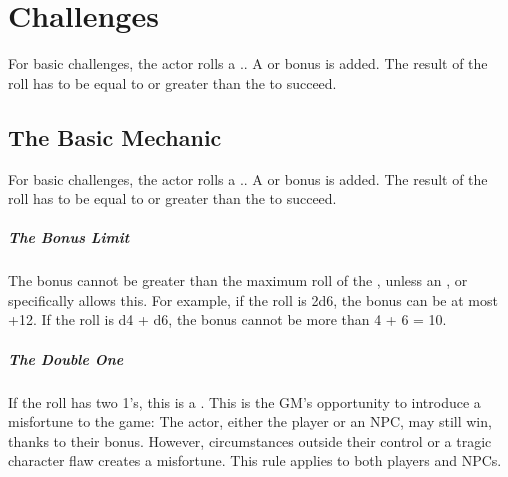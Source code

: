 \documentclass{LegrandOrangeTufteBook}
\begin{document}
\chapterspaceabove{6.75cm}
\chapterspacebelow{11.25cm}


\chapter*{Challenges}

\begin{emphasisParagraph}
	For basic challenges, the actor rolls a ..
	A  or  bonus is added.
	The result of the roll has to be equal to or greater than the  to succeed.
\end{emphasisParagraph}

\section*{The Basic Mechanic}
For basic challenges, the actor rolls a ..
A  or  bonus is added.
The result of the roll has to be equal to
or greater than the  to succeed.\\

\paragraph*{The Bonus Limit}
The bonus cannot be greater than the maximum roll of the ,
unless an ,  or  specifically allows this.
For example, if the roll is 2d6, the bonus can be at most +12. If the roll is d4 + d6,
the bonus cannot be more than 4 + 6 = 10.\\

\paragraph*{The Double One}


If the roll has two 1's, this is a .
This is the GM's opportunity to introduce a misfortune to the game:
The actor, either the player or an NPC, may still win, thanks to their bonus.
However, circumstances outside their control or a tragic character flaw creates a misfortune.
This rule applies to both players and NPCs. \\
\end{document}
